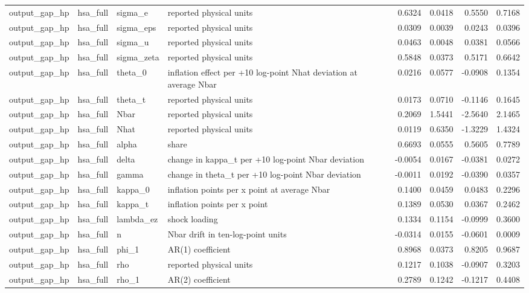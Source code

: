 \begin{tabular}{llllrrrr}
output\_gap\_hp & hsa\_full & sigma\_e & reported physical units & 0.6324 & 0.0418 & 0.5550 & 0.7168 \\
output\_gap\_hp & hsa\_full & sigma\_eps & reported physical units & 0.0309 & 0.0039 & 0.0243 & 0.0396 \\
output\_gap\_hp & hsa\_full & sigma\_u & reported physical units & 0.0463 & 0.0048 & 0.0381 & 0.0566 \\
output\_gap\_hp & hsa\_full & sigma\_zeta & reported physical units & 0.5848 & 0.0373 & 0.5171 & 0.6642 \\
output\_gap\_hp & hsa\_full & theta\_0 & inflation effect per +10 log-point Nhat deviation at average Nbar & 0.0216 & 0.0577 & -0.0908 & 0.1354 \\
output\_gap\_hp & hsa\_full & theta\_t & reported physical units & 0.0173 & 0.0710 & -0.1146 & 0.1645 \\
output\_gap\_hp & hsa\_full & Nbar & reported physical units & 0.2069 & 1.5441 & -2.5640 & 2.1465 \\
output\_gap\_hp & hsa\_full & Nhat & reported physical units & 0.0119 & 0.6350 & -1.3229 & 1.4324 \\
output\_gap\_hp & hsa\_full & alpha & share & 0.6693 & 0.0555 & 0.5605 & 0.7789 \\
output\_gap\_hp & hsa\_full & delta & change in kappa\_t per +10 log-point Nbar deviation & -0.0054 & 0.0167 & -0.0381 & 0.0272 \\
output\_gap\_hp & hsa\_full & gamma & change in theta\_t per +10 log-point Nbar deviation & -0.0011 & 0.0192 & -0.0390 & 0.0357 \\
output\_gap\_hp & hsa\_full & kappa\_0 & inflation points per x point at average Nbar & 0.1400 & 0.0459 & 0.0483 & 0.2296 \\
output\_gap\_hp & hsa\_full & kappa\_t & inflation points per x point & 0.1389 & 0.0530 & 0.0367 & 0.2462 \\
output\_gap\_hp & hsa\_full & lambda\_ez & shock loading & 0.1334 & 0.1154 & -0.0999 & 0.3600 \\
output\_gap\_hp & hsa\_full & n & Nbar drift in ten-log-point units & -0.0314 & 0.0155 & -0.0601 & 0.0009 \\
output\_gap\_hp & hsa\_full & phi\_1 & AR(1) coefficient & 0.8968 & 0.0373 & 0.8205 & 0.9687 \\
output\_gap\_hp & hsa\_full & rho & reported physical units & 0.1217 & 0.1038 & -0.0907 & 0.3203 \\
output\_gap\_hp & hsa\_full & rho\_1 & AR(2) coefficient & 0.2789 & 0.1242 & -0.1217 & 0.4408 \\

\end{tabular}
